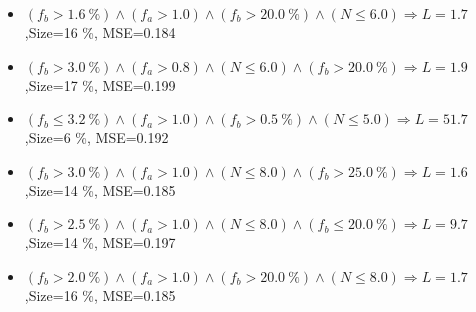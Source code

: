 \documentclass[numbered]{CSL}
\begin{document}
\begin{itemize}
\item $(f_b > 1.6~\%) \land (f_a > 1.0) \land (f_b > 20.0~\%) \land (N \leq 6.0) \Rightarrow L = 1.7$,\hfill Size=16 \%, MSE=0.184
\item $(f_b > 3.0~\%) \land (f_a > 0.8) \land (N \leq 6.0) \land (f_b > 20.0~\%) \Rightarrow L = 1.9$,\hfill Size=17 \%, MSE=0.199
\item $(f_b \leq 3.2~\%) \land (f_a > 1.0) \land (f_b > 0.5~\%) \land (N \leq 5.0) \Rightarrow L = 51.7$,\hfill Size=6 \%, MSE=0.192
\item $(f_b > 3.0~\%) \land (f_a > 1.0) \land (N \leq 8.0) \land (f_b > 25.0~\%) \Rightarrow L = 1.6$,\hfill Size=14 \%, MSE=0.185
\item $(f_b > 2.5~\%) \land (f_a > 1.0) \land (N \leq 8.0) \land (f_b \leq 20.0~\%) \Rightarrow L = 9.7$,\hfill Size=14 \%, MSE=0.197
\item $(f_b > 2.0~\%) \land (f_a > 1.0) \land (f_b > 20.0~\%) \land (N \leq 8.0) \Rightarrow L = 1.7$,\hfill Size=16 \%, MSE=0.185
\end{itemize}
\end{document}
